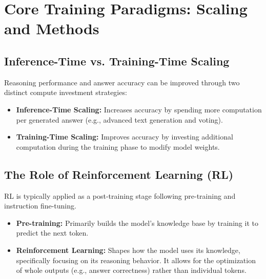 ﻿\section{Core Training Paradigms: Scaling and Methods}
\label{sec:results}


\subsection{Inference-Time vs. Training-Time Scaling}

Reasoning performance and answer accuracy can be improved through two distinct compute investment strategies:

\begin{itemize}
  \item \textbf{Inference-Time Scaling:} Increases accuracy by spending more computation per generated answer (e.g., advanced text generation and voting).
  \item \textbf{Training-Time Scaling:} Improves accuracy by investing additional computation during the training phase to modify model weights.
\end{itemize}


\subsection{The Role of Reinforcement Learning (RL)}

RL is typically applied as a post-training stage following pre-training and instruction fine-tuning.

\begin{itemize}
  \item \textbf{Pre-training:} Primarily builds the model's knowledge base by training it to predict the next token.
  \item \textbf{Reinforcement Learning:} Shapes how the model uses its knowledge, specifically focusing on its reasoning behavior. It allows for the optimization of whole outputs (e.g., answer correctness) rather than individual tokens.
\end{itemize}